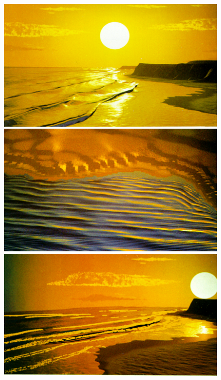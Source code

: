 \begin{figure}
 \centering
 \subtop
 {
  \includegraphics[scale=0.225]{figures/A_Simple_Model_of_Ocean_Waves_-_Fournier_1986-008.png}
 }
 \hfill
 \subtop
 {
  \includegraphics[scale=0.225]{figures/A_Simple_Model_of_Ocean_Waves_-_Fournier_1986-010.png}
 }
 \subtop
 {
  \includegraphics[scale=0.225]{figures/A_Simple_Model_of_Ocean_Waves_-_Fournier_1986-011.png}
 }

\end{figure}
